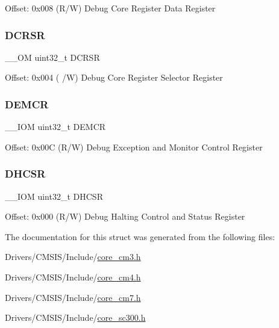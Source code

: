 Offset\+: 0x008 (R/W) Debug Core Register Data Register \mbox{\label{struct_core_debug___type_ab74a9ec90ad18e4f7a20362d362b754a}} 
\subsubsection{\texorpdfstring{D\+C\+R\+SR}{DCRSR}}
{\footnotesize\ttfamily \+\_\+\+\_\+\+OM uint32\+\_\+t D\+C\+R\+SR}

Offset\+: 0x004 ( /W) Debug Core Register Selector Register \mbox{\label{struct_core_debug___type_aa99de5f8c609f10c25ed51f57b2edd74}} 
\subsubsection{\texorpdfstring{D\+E\+M\+CR}{DEMCR}}
{\footnotesize\ttfamily \+\_\+\+\_\+\+I\+OM uint32\+\_\+t D\+E\+M\+CR}

Offset\+: 0x00C (R/W) Debug Exception and Monitor Control Register \mbox{\label{struct_core_debug___type_a94ca828091a9226ab6684fbf30e52909}} 
\subsubsection{\texorpdfstring{D\+H\+C\+SR}{DHCSR}}
{\footnotesize\ttfamily \+\_\+\+\_\+\+I\+OM uint32\+\_\+t D\+H\+C\+SR}

Offset\+: 0x000 (R/W) Debug Halting Control and Status Register 

The documentation for this struct was generated from the following files\+:\begin{DoxyCompactItemize}
\item 
Drivers/\+C\+M\+S\+I\+S/\+Include/\mbox{\hyperlink{core__cm3_8h}{core\+\_\+cm3.\+h}}\item 
Drivers/\+C\+M\+S\+I\+S/\+Include/\mbox{\hyperlink{core__cm4_8h}{core\+\_\+cm4.\+h}}\item 
Drivers/\+C\+M\+S\+I\+S/\+Include/\mbox{\hyperlink{core__cm7_8h}{core\+\_\+cm7.\+h}}\item 
Drivers/\+C\+M\+S\+I\+S/\+Include/\mbox{\hyperlink{core__sc300_8h}{core\+\_\+sc300.\+h}}\end{DoxyCompactItemize}
